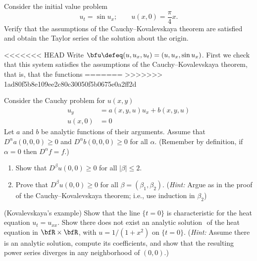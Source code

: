 \begin{problem}
  Consider the initial value problem
  \[
    u_t=\sin u_x;\qquad u(x,0)=\frac{\pi}{4}x.
  \]
  Verify that the assumptions of the Cauchy--Kovalevskaya theorem are
  satisfied and obtain the Taylor series of the solution about the origin.
\end{problem}
\begin{solution}
<<<<<<< HEAD
  Write \(\bfu\defeq(u,u_x,u_t)=(u,u_x,\sin u_x)\). First we check that
  this system satisfies the assumptions of the Cauchy--Kovalevskaya
  theorem, that is, that the functions
=======
>>>>>>> 1ad80f5b8e109ee2c80c30050f5b0675e0a2ff2d
\end{solution}
\newpage

\begin{problem}
  Consider the Cauchy problem for \(u(x,y)\)
  \begin{align*}
    u_y&=a(x, y, u)u_x+b(x,y,u)\\
    u(x,0)&=0
  \end{align*}
  Let \(a\) and \(b\) be analytic functions of their arguments. Assume that
  \(D^\alpha a(0,0,0)\geq 0\) and \(D^\alpha b(0,0,0)\geq 0\) for all
  \(\alpha\). (Remember by definition, if \(\alpha=0\) then
  \(D^\alpha f=f\).)
  \begin{enumerate}[label=(\alph*),noitemsep]
  \item Show that \(D^\beta u(0,0)\geq 0\) for all \(|\beta|\leq 2\).
  \item Prove that \(D^\beta u(0,0)\geq 0\) for all
    \(\beta=(\beta_1,\beta_2)\). (\emph{Hint:} Argue as in the proof of the
    Cauchy--Kovalevskaya theorem; i.e., use induction in \(\beta_2\))
  \end{enumerate}
\end{problem}
\begin{solution}
\end{solution}
\newpage

\begin{problem}
  (Kovalevskaya's example) Show that the line \(\{t=0\}\) is characteristic
  for the heat equation \(u_t=u_{xx}\). Show there does not exist an
  analytic solution \(\) of the heat equation in \(\bfR\times\bfR\), with
  \(u=1/(1+x^2)\) on \(\{t=0\}\). (\emph{Hint:} Assume there is an analytic
  solution, compute its coefficients, and show that the resulting power
  series diverges in any neighborhood of \((0,0)\).)
\end{problem}
\begin{solution}
\end{solution}

